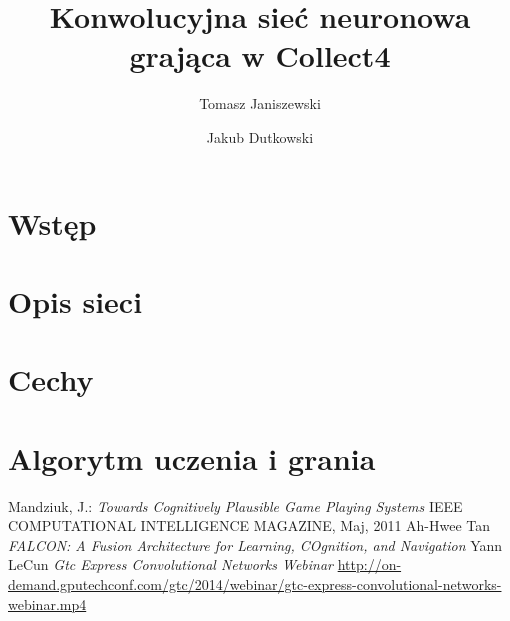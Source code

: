\documentclass{llncs}
\begin{document}
\title{Konwolucyjna sieć neuronowa grająca w Collect4}
%
%
\author{Tomasz Janiszewski \and Jakub Dutkowski}
%
%


\maketitle              %

\begin{abstract}
\end{abstract}
%
\section{Wstęp}
\section{Opis sieci}
\section{Cechy}
\section{Algorytm uczenia i grania}


%
%
\begin{thebibliography}{4}
%
Mandziuk, J.:
\textsl{Towards Cognitively Plausible Game Playing Systems}
IEEE COMPUTATIONAL INTELLIGENCE MAGAZINE, Maj, 2011
Ah-Hwee Tan
\textsl{FALCON: A Fusion Architecture for Learning, COgnition, and Navigation}
Yann LeCun
\textsl{Gtc Express Convolutional Networks Webinar}
\url{http://on-demand.gputechconf.com/gtc/2014/webinar/gtc-express-convolutional-networks-webinar.mp4}
\end{thebibliography}
\end{document}
